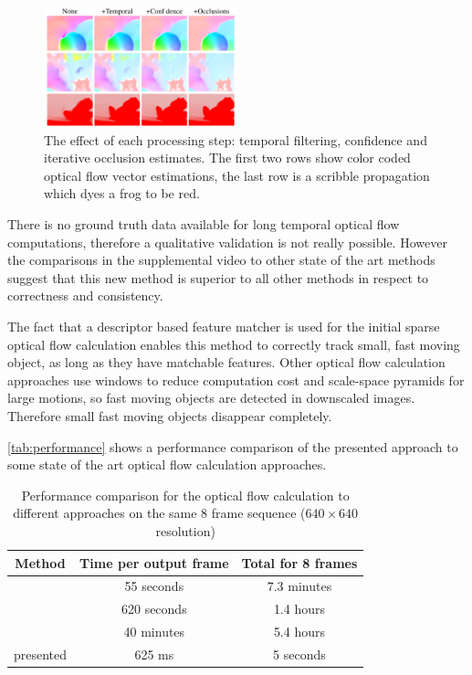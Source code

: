 \documentclass{utue} %
\begin{document}
\begin{figure}[htb]
  \centering
  \includegraphics[width=0.5\textwidth]{images/improvements.png}
  \caption{The effect of each processing step: temporal filtering, confidence
  and iterative occlusion estimates. The first two rows show color coded optical flow
vector estimations, the last row is a scribble propagation which dyes a frog to be red.}
  \label{fig:improvements}
\end{figure}

There is no ground truth data available for long temporal optical flow
computations, therefore a qualitative validation is not really possible. However
the comparisons in the supplemental video to other state of the art methods
suggest that this new method is superior to all other methods in respect to
correctness and consistency.

The fact that a descriptor based feature matcher is used for the initial sparse
optical flow calculation enables this method to correctly track small, fast
moving object, as long as they have matchable features. Other optical flow
calculation approaches use windows to reduce computation cost and scale-space
pyramids for large motions, so fast moving objects are detected in downscaled
images. Therefore small fast moving objects disappear completely.

\autoref{tab:performance} shows a performance comparison of the presented
approach to some state of the art optical flow calculation approaches.
\begin{table}[htb]
  \centering
  {\footnotesize
  \begin{tabular}{|c|cc|}
    \hline
    Method & Time per output frame & Total for 8 frames\\
    \hline \hline
    \cite{Rhemann:2011:FCF:2191740.2191908} & 55 seconds & 7.3 minutes\\
    \cite{Zimmer:2011:OFH:1969654.1969711} & 620 seconds & 1.4 hours\\
    \cite{conf/iccv/VolzBVZ11} & 40 minutes & 5.4 hours\\
    presented& 625 ms & 5 seconds\\ \hline
  \end{tabular}}
  \caption{Performance comparison for the optical flow calculation to different
  approaches on the same 8 frame sequence ($640\times640$ resolution)}
  \label{tab:performance}
\end{table}
\end{document}
